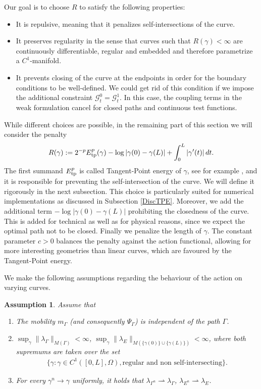 \documentclass{article}
\def\calG{{\mathcal G}} \def\calH{{\mathcal H}} \def\calI{{\mathcal I}}
\newtheorem{assumption}[theorem]{Assumption}
\begin{document}
Our goal is to choose $R$ to satisfy the following properties: 
\begin{itemize}
    \item[i)] It is repulsive, meaning that it penalizes self-intersections of the curve. 
    \item[ii)] It preserves regularity in the sense that curves such that $R(\gamma) < \infty$ are continuously differentiable, regular and embedded and therefore parametrize a $C^1$-manifold.
    \item[iii)] It prevents closing of the curve at the endpoints in order for the boundary conditions to be well-defined. We could get rid of this condition if we impose the additional constraint $\calG^0_t = \calG^1_t$. In this case, the coupling terms in the weak formulation cancel for closed paths and continuous test functions. 
\end{itemize}
While different choices are possible, in the remaining part of this section we will consider the penalty 
\begin{align}\label{eq:penalty}
    R (\gamma) := 2^{-p}E_{\rm tp}^p(\gamma) -\log|\gamma(0) - \gamma(L)| + \int_0^{L} |\gamma'(t)| \, dt.
\end{align}
The first summand $E_{\rm tp}^p$ is called Tangent-Point energy of $\gamma$, see for example \cite{STRZELECKI_2012}, and it is responsible for preventing the self-intersection of the curve. We will define it rigorously in the next subsection. This choice is particularly suited for numerical implementations as discussed in Subsection \ref{DiscTPE}.
Moreover, we add the additional term $ -\log|\gamma(0) - \gamma(L)|$ prohibiting the closedness of the curve. This is added for technical as well as for physical reasons, since we expect the optimal path not to be closed. Finally we penalize the length of $\gamma$.
The constant parameter $c>0$ balances the penalty against the action functional, allowing for more interesting geometries than linear curves, which are favoured by the Tangent-Point energy.


We make the following assumptions regarding the behaviour of the action on varying curves.

\begin{assumption}\label{ass:additional}
Assume that 
\begin{enumerate}
\item The mobility $m_\Gamma$ (and consequently $\Psi_\Gamma$) is independent of the path $\Gamma$.
\item $\sup_{\gamma} \|\lambda_\Gamma\|_{M(\Gamma)} < \infty$, $\sup_{\gamma}  \|\lambda_E\|_{M(\{\gamma(0)\} \cup \{\gamma(L)\})} < \infty$, where both supremums are taken over the set 
\begin{align*}
    \{\gamma: \gamma \in C^1([0,L],\Omega), \text{regular and non self-intersecting}\}.
\end{align*}
\item For every $\gamma^n \rightarrow \gamma$ uniformly, it holds that $\lambda_{\Gamma^n} \rightharpoonup \lambda_{\Gamma}$, $\lambda_{E^n} \rightharpoonup \lambda_{E}$.
\end{enumerate}
\end{assumption}
\end{document}
